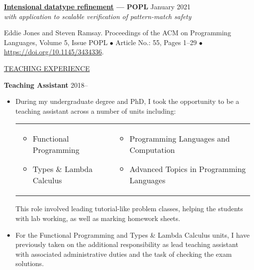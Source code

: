 \documentclass{letter}
\renewcommand{\emph}[1]{\textit{#1}}
\begin{document}
\textbf{\href{https://dl.acm.org/doi/10.1145/3434336}{Intensional datatype refinement} --- POPL} \hfill January 2021\\
\emph{with application to scalable verification of pattern-match safety}

Eddie Jones and Steven Ramsay.
Proceedings of the ACM on Programming Languages, Volume 5, Issue POPL \( \bullet \) Article No.: 55, Pages 1--29 \( \bullet \) \url{https://doi.org/10.1145/3434336}.

\vspace{10pt}

\uline{{\large TEACHING EXPERIENCE}\hfill}

\vspace{5pt}

\textbf{Teaching Assistant} \hfill 2018--\phantom{2021}
\begin{itemize}
  \item During my undergraduate degree and PhD, I took the opportunity to be a teaching assistant across a number of units including:
        \begin{center}
          \begin{tabular}{p{}p{}}
            \begin{itemize}
              \setlength\itemsep{0pt}
              \item Functional Programming
              \item Types \& Lambda Calculus
            \end{itemize}

             &
            \begin{itemize}
              \setlength\itemsep{0pt}
              \item Programming Languages and Computation
              \item Advanced Topics in Programming Languages
            \end{itemize}
          \end{tabular}
        \end{center}

        This role involved leading tutorial-like problem classes, helping the students with lab working, as well as marking homework sheets.
  
  \item For the Functional Programming and Types \& Lambda Calculus units, I have previously taken on the additional responsibility as lead teaching assistant with associated administrative duties and the task of checking the exam solutions.
\end{itemize}
\end{document}
